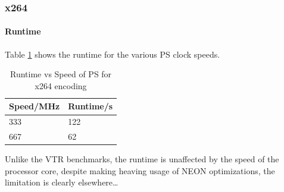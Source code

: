 \documentclass[a4paper]{article}
\begin{document}
\subsubsection{x264}
  \paragraph{Runtime}
    Table \ref{tab:x264:rt} shows the runtime for the various PS clock speeds.
    \begin{table}[tbp]
      \centering
      \begin{tabular}{l | l}
        Speed/MHz & Runtime/s \\
        \hline
        333 & 122 \\
        667 & 62 \\
      \end{tabular}
      \caption{Runtime vs Speed of PS for x264 encoding}
      \label{tab:x264:rt}
    \end{table}
    Unlike the VTR benchmarks, the runtime is unaffected by the speed of the processor core, despite making heaving usage of NEON optimizations, the limitation is clearly elsewhere\ldots
\end{document}
